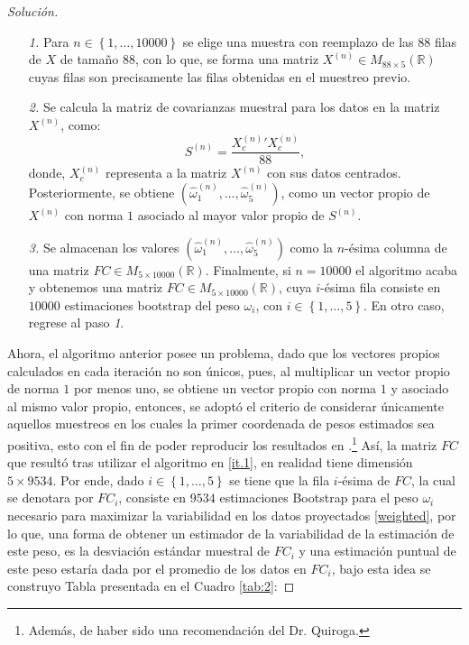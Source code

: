 \documentclass[10.5pt,notitlepage]{article}
\newenvironment{solucion}
  {\begin{proof}[Solución]}
  {\end{proof}}
\newcommand{\RR}{\mathbb{R}}
\newcommand{\kis}[1]{\left\{ #1 \right\}}
\theoremstyle{plain}
\begin{document}
\begin{solucion}
\begin{itemize}\label{it.1}
    \item[\textit{1.}] Para \(n \in \kis{1, \hdots, 10000}\) se elige una muestra con reemplazo de las \(88\) filas de \(X\) de tamaño \(88\), con lo que, se forma una matriz \(X^{(n)} \in M_{88 \times 5}(\RR)\) cuyas filas son precisamente las filas obtenidas en el muestreo previo. 
    \item[\textit{2.}] Se calcula la matriz de covarianzas muestral para los datos en la matriz \(X^{(n)}\), como:
    \[S^{(n)} = \frac{X_{c}^{(n)}'X_{c}^{(n)}}{88},\]
    donde, \(X_{c}^{(n)}\) representa a la matriz \(X^{(n)}\) con sus datos centrados. Posteriormente, se obtiene \((\hat{\omega}_{1}^{(n)},\hdots, \hat{\omega}_{5}^{(n)})\), como un vector propio de \(X^{(n)}\) con norma \(1\) asociado al mayor valor propio de \(S^{(n)}\).
     \item[\textit{3.}] Se almacenan los valores \((\hat{\omega}_{1}^{(n)},\hdots, \hat{\omega}_{5}^{(n)})\) como la \(n\)-ésima columna de una matriz \(FC \in M_{5\times 10000}(\RR)\). Finalmente, si \(n = 10000\) el algoritmo acaba y obtenemos una matriz \(FC \in M_{5\times 10000}(\RR)\), cuya \(i\)-ésima fila consiste en \(10000\) estimaciones bootstrap del peso \(\omega_i\), con \(i\in \kis{1, \hdots,5}\). En otro caso, regrese al paso \textit{1}. 
\end{itemize}
Ahora, el algoritmo anterior posee un problema, dado que los vectores propios calculados en cada iteración no son únicos, pues, al multiplicar un vector propio de norma \(1\) por menos uno, se obtiene un vector propio con norma \(1\) y asociado al mismo valor propio, entonces, se adoptó el criterio de considerar únicamente aquellos muestreos en los cuales la primer coordenada de pesos estimados sea positiva, esto con el fin de poder reproducir los resultados en \textcite{diaconis_computer-intensive_1983}.\footnote{Además, de haber sido una recomendación del Dr. Quiroga.} Así, la matriz \(FC\) que resultó tras utilizar el algoritmo en \ref{it.1}, en realidad tiene dimensión \(5 \times 9534\). Por ende, dado \(i \in \kis{1, \hdots, 5}\) se tiene que la fila \(i\)-ésima de \(FC\), la cual se denotara por \(FC_i\), consiste en \(9534\) estimaciones Bootstrap para el peso \(\omega_i\) necesario para maximizar la variabilidad en los datos proyectados \eqref{weighted}, por lo que, una forma de obtener un estimador de la variabilidad de la estimación de este peso, es la desviación estándar muestral de \(FC_i\) y una estimación puntual de este peso estaría dada por el promedio de los datos en \(FC_i\), bajo esta idea se construyo Tabla presentada en el Cuadro \ref{tab:2}:

\end{solucion}
\end{document}
